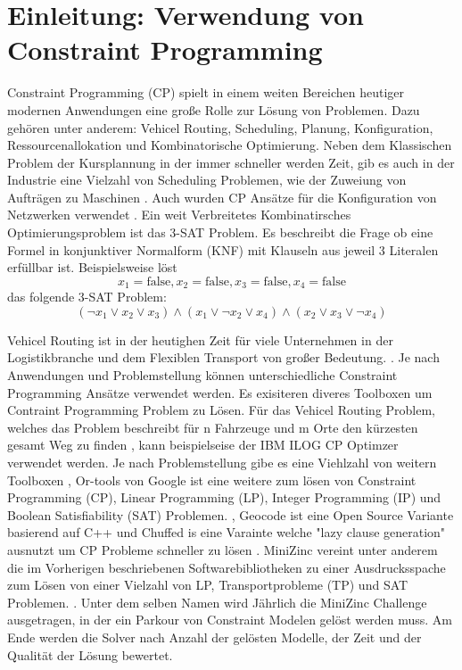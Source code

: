 




\tableofcontents

\clearpage
{}


\section{Einleitung: Verwendung von Constraint Programming}
\label{sec:Einleitung: Verwendung von Constraint Programming}
Constraint Programming (CP) spielt in einem weiten Bereichen heutiger modernen
Anwendungen eine große Rolle zur Lösung von Problemen. Dazu gehören unter
anderem: Vehicel Routing, Scheduling, Planung, Konfiguration,
Ressourcenallokation und Kombinatorische Optimierung. Neben dem Klassischen
Problem der Kursplannung \cite{duboi96jo} in der immer schneller werden Zeit,
gib es auch in der Industrie eine Vielzahl von Scheduling Problemen, wie der
Zuweiung von Aufträgen zu Maschinen \cite{gedik16jo}. Auch wurden CP Ansätze für
die Konfiguration von Netzwerken verwendet \cite{ardisjo}. Ein weit Verbreitetes
Kombinatirsches Optimierungsproblem ist das 3-SAT Problem. Es beschreibt die
Frage ob eine Formel in konjunktiver Normalform (KNF) mit Klauseln aus jeweil 3
Literalen erfüllbar ist.
\cite[271]{rossi06bo} 
Beispielsweise löst
$$x_1=\mathrm{false},x_2=\mathrm{false},x_3=\mathrm{false},x_4=\mathrm{false}$$
das folgende 3-SAT Problem: 
$$(\lnot x_1\lor x_2\lor x_3)\land(x_1\lor\lnot x_2\lor x_4)\land(x_2\lor x_3\lor\lnot x_4)$$

Vehicel Routing ist in der
heutighen Zeit für viele Unternehmen in der Logistikbranche und dem Flexiblen
Transport von großer Bedeutung. \cite[1]{delec22jo}. Je nach Anwendungen und
Problemstellung können unterschiedliche Constraint Programming Ansätze verwendet
werden. Es exisiteren diveres Toolboxen um Contraint Programming Problem zu
Lösen. Für das Vehicel Routing Problem, welches das Problem beschreibt für n
Fahrzeuge und m Orte den kürzesten gesamt Weg zu finden \cite[222]{labor18jo},
kann beispielseise der IBM ILOG CP Optimzer verwendet werden.\cite{IBMIwe} Je
nach Problemstellung gibe es eine Viehlzahl von weitern Toolboxen
\cite{Solviwea}, Or-tools von Google ist eine weitere zum lösen von Constraint
Programming (CP), Linear Programming (LP), Integer Programming (IP) und Boolean
Satisfiability (SAT) Problemen. \cite{ORToowe}, Geocode ist eine Open Source
Variante basierend auf C++ \cite{GECODwe} und Chuffed is eine Varainte welche
"lazy clause generation" ausnutzt um CP Probleme schneller zu lösen
\cite{Chuff24co}. MiniZinc vereint unter anderem die im Vorherigen beschriebenen
Softwarebibliotheken zu einer Ausdrucksspache zum Lösen von einer Vielzahl von LP, Transportprobleme (TP) und SAT Problemen.
\cite{MiniZwe}. Unter dem selben Namen wird Jährlich die MiniZinc Challenge ausgetragen, in der
ein Parkour von Constraint Modelen gelöst werden muss. Am Ende werden die Solver
nach Anzahl der gelösten Modelle, der Zeit und der Qualität der Lösung bewertet.
\cite{Homewe}

